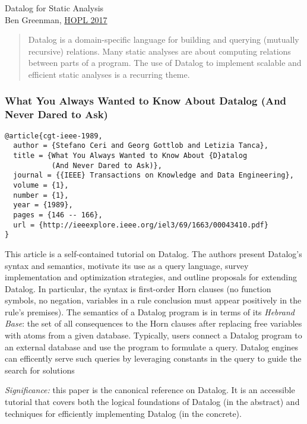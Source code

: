 \documentclass{article}
\renewcommand{\maketitle}[2]{\begin{center}{\large \textsf{#1} } \\[1ex] \textsf{#2, \href{http://www.ccs.neu.edu/home/matthias/7480-s17/index.html}{HOPL 2017}} \end{center}}
\begin{document}
\maketitle{Datalog for Static Analysis}{Ben Greenman}

\begin{abstract}
  Datalog is a domain-specific language for building and querying (mutually recursive) relations.
  Many static analyses are about computing relations between parts of a program.
  The use of Datalog to implement scalable and efficient static analyses is a recurring theme.
\end{abstract}

\subsubsection*{What You Always Wanted to Know About Datalog (And Never Dared to Ask)}
\begin{verbatim}
@article{cgt-ieee-1989,
  author = {Stefano Ceri and Georg Gottlob and Letizia Tanca},
  title = {What You Always Wanted to Know About {D}atalog
           (And Never Dared to Ask)},
  journal = {{IEEE} Transactions on Knowledge and Data Engineering},
  volume = {1},
  number = {1},
  year = {1989},
  pages = {146 -- 166},
  url = {http://ieeexplore.ieee.org/iel3/69/1663/00043410.pdf}
}
\end{verbatim}

This article is a self-contained tutorial on Datalog.
The authors present Datalog's syntax and semantics, motivate its use as a query language, survey implementation and optimization strategies, and outline proposals for extending Datalog.
In particular, the syntax is first-order Horn clauses (no function symbols, no negation, variables in a rule conclusion must appear positively in the rule's premises).
The semantics of a Datalog program is in terms of its \emph{Hebrand Base}: the set of all consequences to the Horn clauses after replacing free variables with atoms from a given database.
Typically, users connect a Datalog program to an external database and use the program to formulate a query.
Datalog engines can efficently serve such queries by leveraging constants in the query to guide the search for solutions 

\emph{Significance:} this paper is the canonical reference on Datalog.
It is an accessible tutorial that covers both the logical foundations of Datalog (in the abstract) and techniques for efficiently implementing Datalog (in the concrete).
\end{document}
